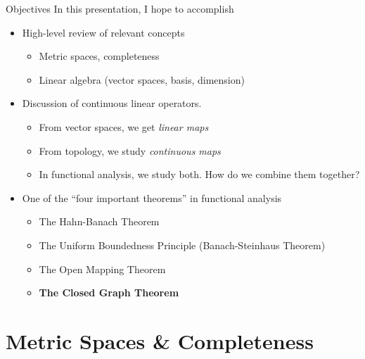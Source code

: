 \documentclass[10pt]{beamer}
\begin{document}
    \begin{frame}{Objectives}
        In this presentation, I hope to accomplish
        \begin{itemize}
            \item High-level review of relevant concepts 
            \begin{itemize}
                \item Metric spaces, completeness 
                \item Linear algebra (vector spaces, basis, dimension)
            \end{itemize}

            \item Discussion of \alert{continuous linear operators}. 
            \begin{itemize}
                \item From vector spaces, we get \emph{linear maps}
                \item From topology, we study \emph{continuous maps}
                \item In functional analysis, we study both. How do we combine them together?
            \end{itemize}
        \end{itemize}

        \begin{itemize}
            \item One of the ``four important theorems'' in functional analysis 
            \begin{itemize}
                \item The Hahn-Banach Theorem
                \item The Uniform Boundedness Principle (Banach-Steinhaus Theorem)
                \item The Open Mapping Theorem
								\item \textbf{The Closed Graph Theorem}
            \end{itemize}
        \end{itemize}
    \end{frame}

    \section{Metric Spaces \& Completeness}
\end{document}
